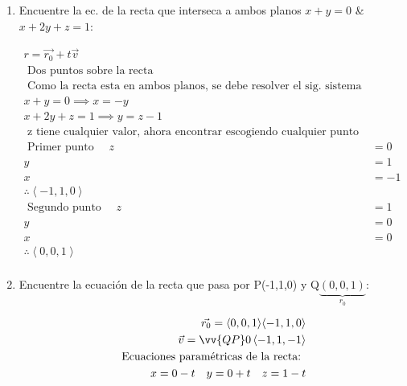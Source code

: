 \begin{enumerate}
    \item Encuentre la ec. de la recta que interseca a ambos planos $x+y=0$ \& $x+2y+z=1$: 
        \begin{center}
            \begin{align*}
                r = \vec{r_0} + t \vec{v} \\ 
                \text{  Dos puntos sobre la recta  } \\ 
                \text{  Como la recta esta en ambos planos, se debe resolver el sig. sistema de ecuaciones  } \\ 
                x + y = 0 \implies x=-y \\ 
                x+2y+z=1 \implies y = z-1 \\ 
                \text{  z tiene cualquier valor, ahora encontrar escogiendo cualquier punto sobre la recta, en este caso 0   } \\ 
                \text{  Primer punto   } \quad z & = 0 \\
                y &= 1\\ 
                x & = -1 \\ 
                \therefore \left\langle -1,1,0 \right\rangle \\ 
                \text{  Segundo punto  } \quad z &= 1 \\ 
                y & = 0 \\ 
                x & = 0 \\ 
                \therefore \left\langle 0,0,1 \right\rangle \\ 
            \end{align*}
        \end{center}
    
    \item Encuentre la ecuación de la recta que pasa por P(-1,1,0) y Q$\underbrace{(0,0,1)}_{r_0}$:
        \begin{center}
            \begin{align*}
                \vec{r_0} = \left\langle 0,0,1 \right\rangle \! \left\langle -1,1,0 \right\rangle \\ 
                \vec{v} = \vv{QP} 0 \left\langle -1,1,-1 \right\rangle \\ 
                \text{  Ecuaciones paramétricas de la recta:  } \\ 
                x = 0-t \quad y = 0 + t \quad z = 1-t \\ 
            \end{align*}
        \end{center}
    

\end{enumerate}
